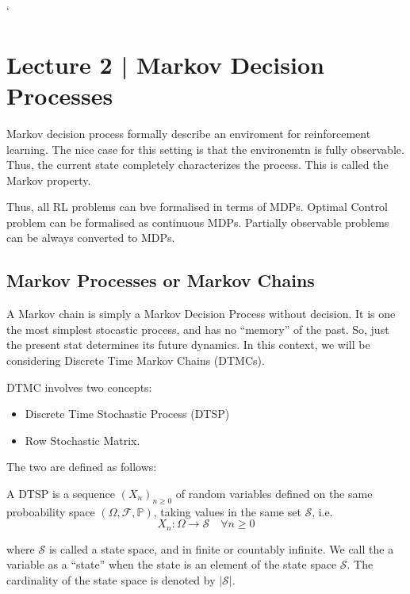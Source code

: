 `\section{{Lecture 2 | Markov Decision Processes}}
Markov decision process formally describe an enviroment for reinforcement
learning. The nice case for this setting is that the environemtn is fully observable. Thus,
the current state completely characterizes the process. This is called the Markov property.

Thus, all RL problems can bve formalised in terms of MDPs. Optimal Control problem can be 
formalised as continuous MDPs. Partially observable problems can be always converted 
to MDPs.
\subsection{Markov Processes or Markov Chains}
A Markov chain is simply a Markov Decision Process without decision. It is one the 
most simplest stocastic process, and has no ``memory'' of the past. So, just the 
present stat determines its future dynamics. In this context, we will be considering
Discrete Time Markov Chains (DTMCs).

DTMC involves two concepts:
\begin{itemize}
    \item Discrete Time Stochastic Process (DTSP)
    \item Row Stochastic Matrix.
\end{itemize}

The two are defined as follows:

\begin{definition}
    A DTSP is a sequence \({(X_n)}_{n \geq 0}\) of random variables defined on the same proboability space
    \((\Omega, \mathcal{F} , \mathbb{P} )\), taking values in the same 
    set \(\mathcal{S} \), i.e.
    \[
        X_n : \Omega \rightarrow \mathcal{S} \quad \forall n \geq 0
    \]
\end{definition}
where \(\mathcal{S} \) is called a state space, and in finite or countably infinite.
We call the a variable as a ``state'' when the state is an element of the state space \(\mathcal{S} \).
The cardinality of the state space is denoted by \(|\mathcal{S} |\).

